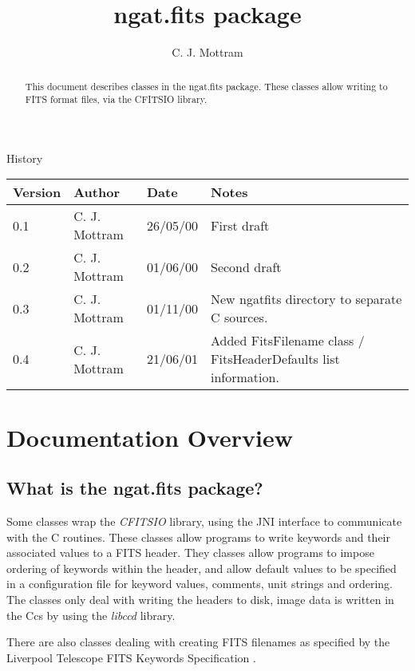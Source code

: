 \documentclass[10pt,a4paper]{article}
\title{ngat.fits package}
\author{C. J. Mottram}
\date{}
\begin{document}
\thispagestyle{empty}
\maketitle
\begin{abstract}
This document describes classes in the ngat.fits package.
These classes allow writing to FITS format files, via the CFITSIO library.
\end{abstract}

\centerline{\Large History}
\begin{center}
\begin{tabular}{|l|l|l|p{15em}|}
\hline
{\bf Version} & {\bf Author} & {\bf Date} & {\bf Notes} \\
\hline
0.1 & C. J. Mottram & 26/05/00 & First draft \\
0.2 & C. J. Mottram & 01/06/00 & Second draft \\
0.3 & C. J. Mottram & 01/11/00 & New ngatfits directory to separate C sources. \\
0.4 & C. J. Mottram & 21/06/01 & Added FitsFilename class / FitsHeaderDefaults list information. \\
\hline
\end{tabular}
\end{center}

\newpage
\tableofcontents
\listoffigures
\listoftables
\newpage

\section{Documentation Overview}
\subsection{What is the ngat.fits package?}
Some classes wrap the {\em CFITSIO} library, using the JNI interface to communicate with the C routines.
These classes allow programs to write keywords and their associated values to a FITS header. 
They classes allow programs to impose ordering of keywords within the header, and allow default values to
be specified in a configuration file for keyword values, comments, unit strings and ordering. The classes
only deal with writing the headers to disk, image data is written in the Ccs by using the {\em libccd}
\cite{bib:libccd} library.

There are also classes dealing with creating FITS filenames as specified by the Liverpool Telescope FITS Keywords 
Specification \cite{bib:ltfitskeywordspec}.
\end{document}
